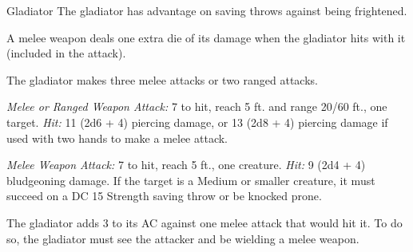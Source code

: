 \documentclass[10pt,a4paper,twoside,bg=print,twocolumn,openany,nodeprecatedcode]{dndbook}
\begin{document}
\begin{DndMonster}[float=t]{Gladiator}
\DndMonsterBasics[
armor-class = {16 (studded leather armor)},
hit-points = {\DndDice{15d8 + 45}},
speed = {30 ft.}
]
\DndMonsterAbilityScores[
 str = 18,
 dex = 15,
 con = 16,
 int = 10,
 wis = 12,
 cha = 15
]
\DndMonsterDetails[
saving-throws = {Str +7, Dex +5, Con +6},
skills = {Athletics +10, Intimidation +5},
languages = {any one language (usually Common)},
challenge = 5,
]
The gladiator has advantage on saving throws against being frightened.

A melee weapon deals one extra die of its damage when the gladiator hits with it (included in the attack).

The gladiator makes three melee attacks or two ranged attacks.

\textsl{Melee or Ranged Weapon Attack:} 7 to hit, reach 5 ft. and range 20/60 ft., one target. \textsl{Hit:} 11 (2d6 + 4) piercing damage, or 13 (2d8 + 4) piercing damage if used with two hands to make a melee attack.

\textsl{Melee Weapon Attack:} 7 to hit, reach 5 ft., one creature. \textsl{Hit:} 9 (2d4 + 4) bludgeoning damage. If the target is a Medium or smaller creature, it must succeed on a DC 15 Strength saving throw or be knocked prone.

The gladiator adds 3 to its AC against one melee attack that would hit it. To do so, the gladiator must see the attacker and be wielding a melee weapon.

\end{DndMonster}


\clearpage
\end{document}
